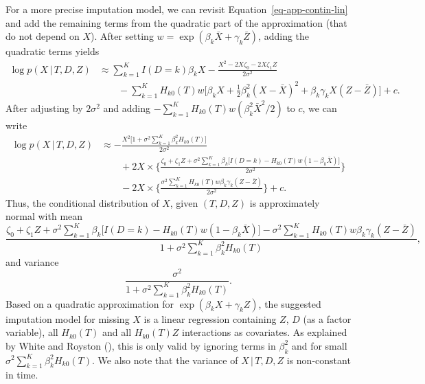 \documentclass[
  letterpaper,
  DIV=11,
  numbers=noendperiod]{scrreprt}
\newcommand{\given}{\,|\,}
\begin{document}
For a more precise imputation model, we can revisit
Equation~\ref{eq-app-contin-lin} and add the remaining terms from the
quadratic part of the approximation (that do not depend on \(X\)). After
setting \(w = \exp(\beta_k \bar{X} + \gamma_k \bar{Z})\), adding the
quadratic terms yields \begin{align*}
    \log p(X \given T, D, Z) &\approx \sum^K_{k = 1} I(D=k) \beta_k X - \frac{X^2 - 2X\zeta_0 - 2X\zeta_1 Z}{2\sigma^2} \\
    &\qquad - \sum^K_{k = 1} H_{k0}(T) w \bigg[ \beta_k X + \frac{1}{2} \beta_k^2(X - \bar{X})^2 + \beta_k \gamma_k X (Z - \bar{Z}) \bigg] + c.
\end{align*} After adjusting by \(2\sigma^2\) and adding
\(- \sum^K_{k = 1} H_{k0}(T) w(\beta^2_k\bar{X}^2/2)\) to \(c\), we can
write \begin{align*}
    \log p(X \given T, D, Z) &\approx -\frac{X^2\big[1 + \sigma^2 \sum^K_{k = 1} \beta_k^2  H_{k0}(T)\big]}{2\sigma^2} \\
    &\qquad + 2X \times \Biggl\{ \frac{\zeta_0 + \zeta_1 Z +  \sigma^2 \sum^K_{k = 1} \beta_k \big[ I(D=k) - H_{k0}(T)w(1 - \beta_k \bar{X}) \big]}{2\sigma^2} \Biggr\} \\
    &\qquad - 2X \times \Biggl\{ \frac{\sigma^2\sum^K_{k = 1}H_{k0}(T)w \beta_k \gamma_k(Z - \bar{Z})}{2\sigma^2}\Biggr\} + c.
\end{align*} Thus, the conditional distribution of \(X\), given
\((T, D, Z)\) is approximately normal with mean \begin{equation*}
    \frac{\zeta_0 + \zeta_1 Z +  \sigma^2 \sum^K_{k = 1} \beta_k \big[ I(D=k) - H_{k0}(T)w(1 - \beta_k \bar{X}) \big] - \sigma^2\sum^K_{k = 1}H_{k0}(T)w \beta_k \gamma_k(Z - \bar{Z})}{1 + \sigma^2 \sum^K_{k = 1} \beta_k^2  H_{k0}(T)},
\end{equation*} and variance \begin{equation*}
    \frac{\sigma^2}{1 + \sigma^2 \sum^K_{k = 1} \beta_k^2  H_{k0}(T)}.
\end{equation*} Based on a quadratic approximation for
\(\exp(\beta_k X + \gamma_k Z)\), the suggested imputation model for
missing \(X\) is a linear regression containing \(Z\), \(D\) (as a
factor variable), all \(H_{k0}(T)\) and all \(H_{k0}(T)Z\) interactions
as covariates. As explained by White and Royston
(), this is only
valid by ignoring terms in \(\beta^2_k\) and for small
\(\sigma^2 \sum^K_{k = 1} \beta_k^2  H_{k0}(T)\). We also note that the
variance of \(X \given T, D, Z\) is non-constant in time.
\end{document}
